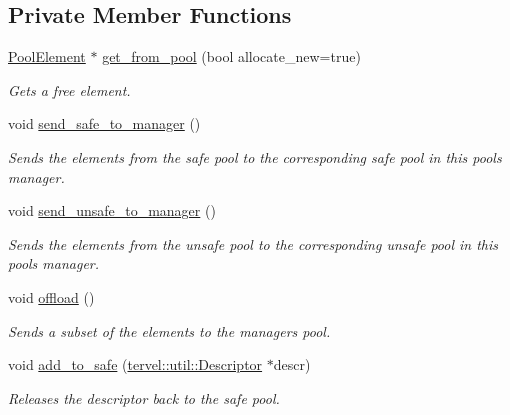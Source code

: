 \subsection*{Private Member Functions}
\begin{DoxyCompactItemize}
\item 
\hyperlink{classtervel_1_1util_1_1memory_1_1rc_1_1_pool_element}{Pool\+Element} $\ast$ \hyperlink{classtervel_1_1util_1_1memory_1_1rc_1_1_descriptor_pool_a6a96d2e2269fdf2b9f56bf4249f1ef24}{get\+\_\+from\+\_\+pool} (bool allocate\+\_\+new=true)
\begin{DoxyCompactList}\small\item\em Gets a free element. \end{DoxyCompactList}\item 
void \hyperlink{classtervel_1_1util_1_1memory_1_1rc_1_1_descriptor_pool_a768ce63acad7353b919e71c722f5fe30}{send\+\_\+safe\+\_\+to\+\_\+manager} ()
\begin{DoxyCompactList}\small\item\em Sends the elements from the safe pool to the corresponding safe pool in this pool\textquotesingle{}s manager. \end{DoxyCompactList}\item 
void \hyperlink{classtervel_1_1util_1_1memory_1_1rc_1_1_descriptor_pool_a3e869b61b3689ce58c8749016d380926}{send\+\_\+unsafe\+\_\+to\+\_\+manager} ()
\begin{DoxyCompactList}\small\item\em Sends the elements from the unsafe pool to the corresponding unsafe pool in this pool\textquotesingle{}s manager. \end{DoxyCompactList}\item 
void \hyperlink{classtervel_1_1util_1_1memory_1_1rc_1_1_descriptor_pool_a362beb1ef559ba40a64ca78ffca12cff}{offload} ()
\begin{DoxyCompactList}\small\item\em Sends a subset of the elements to the managers pool. \end{DoxyCompactList}\item 
void \hyperlink{classtervel_1_1util_1_1memory_1_1rc_1_1_descriptor_pool_a573585b4dd774585e2430970f8c1b3fb}{add\+\_\+to\+\_\+safe} (\hyperlink{classtervel_1_1util_1_1_descriptor}{tervel\+::util\+::\+Descriptor} $\ast$descr)
\begin{DoxyCompactList}\small\item\em Releases the descriptor back to the safe pool. \end{DoxyCompactList}\item 

\end{DoxyCompactItemize}
